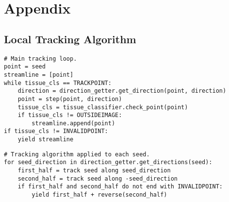\section{Appendix}

\subsection{Local Tracking Algorithm}
\label{appendix:algo}

\begin{verbatim}
# Main tracking loop.
point = seed
streamline = [point]
while tissue_cls == TRACKPOINT:
    direction = direction_getter.get_direction(point, direction)
    point = step(point, direction)
    tissue_cls = tissue_classifier.check_point(point)
    if tissue_cls != OUTSIDEIMAGE:
        streamline.append(point)
if tissue_cls != INVALIDPOINT:
    yield streamline
\end{verbatim}

\begin{verbatim}
# Tracking algorithm applied to each seed.
for seed_direction in direction_getter.get_directions(seed):
    first_half = track seed along seed_direction
    second_half = track seed along -seed_direction
    if first_half and second_half do not end with INVALIDPOINT:
        yield first_half + reverse(second_half)
\end{verbatim}
